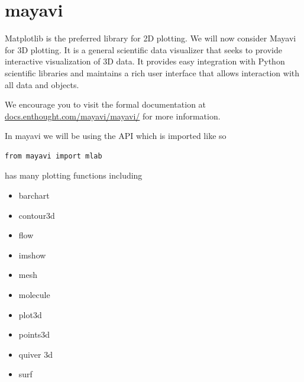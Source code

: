 \section*{mayavi}

Matplotlib is the preferred library for 2D plotting. We will now
consider Mayavi for 3D plotting. It is a general scientific data
visualizer that seeks to provide interactive visualization of 3D data.
It provides easy integration with Python scientific libraries and
maintains a rich user interface that allows interaction with all data
and objects.

We encourage you to visit the formal documentation at
\url{docs.enthought.com/mayavi/mayavi/} for more information. 

In mayavi we will be using the  API which is imported like so
\begin{lstlisting}
from mayavi import mlab
\end{lstlisting}

 has many plotting functions including
\begin{itemize}
\item barchart
\item contour3d
\item flow
\item imshow
\item mesh
\item molecule
\item plot3d
\item points3d
\item quiver 3d
\item surf
\end{itemize}


